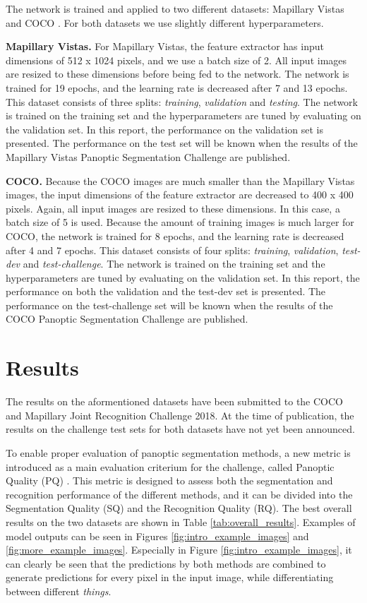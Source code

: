 \documentclass[10pt,twocolumn,letterpaper]{article}
\begin{document}
The network is trained and applied to two different datasets: Mapillary Vistas \cite{Neuhold2017} and COCO \cite{Lin2014}. For both datasets we use slightly different hyperparameters.

\textbf{Mapillary Vistas.} For Mapillary Vistas, the feature extractor has input dimensions of 512 x 1024 pixels, and we use a batch size of 2. All input images are resized to these dimensions before being fed to the network. The network is trained for 19 epochs, and the learning rate is decreased after 7 and 13 epochs. This dataset consists of three splits: \textit{training}, \textit{validation} and \textit{testing}. The network is trained on the training set and the hyperparameters are tuned by evaluating on the validation set. In this report, the performance on the validation set is presented. The performance on the test set will be known when the results of the Mapillary Vistas Panoptic Segmentation Challenge are published.

\textbf{COCO.} Because the COCO images are much smaller than the Mapillary Vistas images, the input dimensions of the feature extractor are decreased to 400 x 400 pixels. Again, all input images are resized to these dimensions. In this case, a batch size of 5 is used. Because the amount of training images is much larger for COCO, the network is trained for 8 epochs, and the learning rate is decreased after 4 and 7 epochs. This dataset consists of four splits: \textit{training}, \textit{validation}, \textit{test-dev} and \textit{test-challenge}. The network is trained on the training set and the hyperparameters are tuned by evaluating on the validation set. In this report, the performance on both the validation and the test-dev set is presented. The performance on the test-challenge set will be known when the results of the COCO Panoptic Segmentation Challenge are published.





\section{Results}

The results on the aformentioned datasets have been submitted to the COCO and Mapillary Joint Recognition Challenge 2018. At the time of publication, the results on the challenge test sets for both datasets have not yet been announced.

To enable proper evaluation of panoptic segmentation methods, a new metric is introduced as a main evaluation criterium for the challenge, called Panoptic Quality (PQ) \cite{Kirillov2018}. This metric is designed to assess both the segmentation and recognition performance of the different methods, and it can be divided into the Segmentation Quality (SQ) and the Recognition Quality (RQ). The best overall results on the two datasets are shown in Table \ref{tab:overall_results}. Examples of model outputs can be seen in Figures \ref{fig:intro_example_images} and \ref{fig:more_example_images}. Especially in Figure \ref{fig:intro_example_images}, it can clearly be seen that the predictions by both methods are combined to generate predictions for every pixel in the input image, while differentiating between different \textit{things}.
\end{document}
